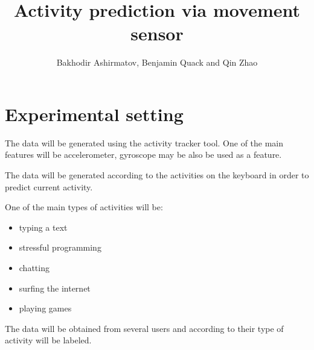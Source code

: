 \documentclass[11pt,a4paper]{paper}
\title{Activity prediction via movement sensor}
\author{Bakhodir Ashirmatov, Benjamin Quack and Qin Zhao}
\begin{document}
\maketitle

\section*{Experimental setting}

The data will be generated using the activity tracker tool. One of the main features will be accelerometer, gyroscope may be also be used as a feature. 

The data will be generated according to the activities on the keyboard in order to predict current activity.

One of the main types of activities will be:

\begin{itemize}
\item typing a text
\item stressful programming
\item chatting
\item surfing the internet
\item playing games
\end{itemize}

The data will be obtained from several users and according to their type of activity will be labeled.
\end{document}
